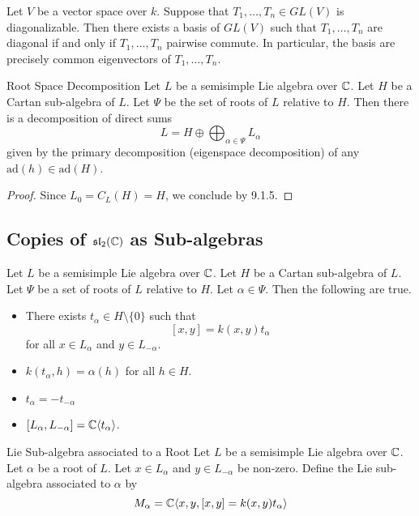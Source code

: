 \documentclass[a4paper]{article}
\begin{document}
\begin{lmm}{}{} Let $V$ be a vector space over $k$. Suppose that $T_1,\dots,T_n\in GL(V)$ is diagonalizable. Then there exists a basis of $GL(V)$ such that $T_1,\dots,T_n$ are diagonal if and only if $T_1,\dots,T_n$ pairwise commute. In particular, the basis are precisely common eigenvectors of $T_1,\dots,T_n$. 
\end{lmm}

\begin{thm}{Root Space Decomposition}{} Let $L$ be a semisimple Lie algebra over $\mathbb{C}$. Let $H$ be a Cartan sub-algebra of $L$. Let $\Psi$ be the set of roots of $L$ relative to $H$. Then there is a decomposition of direct sums $$L=H\oplus\bigoplus_{\alpha\in\Psi}L_\alpha$$ given by the primary decomposition (eigenspace decomposition) of any $\text{ad}(h)\in\text{ad}(H)$. \tcbline
\begin{proof}
Since $L_0=C_L(H)=H$, we conclude by 9.1.5. 
\end{proof}
\end{thm}

\subsection{Copies of $\mathfrak{sl}_2(\mathbb{C})$ as Sub-algebras}
\begin{lmm}{}{} Let $L$ be a semisimple Lie algebra over $\mathbb{C}$. Let $H$ be a Cartan sub-algebra of $L$. Let $\Psi$ be a set of roots of $L$ relative to $H$. Let $\alpha\in\Psi$. Then the following are true. 
\begin{itemize}
\item There exists $t_\alpha\in H\setminus\{0\}$ such that $$[x,y]=k(x,y)t_\alpha$$ for all $x\in L_\alpha$ and $y\in L_{-\alpha}$. 
\item $k(t_\alpha,h)=\alpha(h)$ for all $h\in H$. 
\item $t_\alpha=-t_{-\alpha}$
\item $[L_\alpha,L_{-\alpha}]=\mathbb{C}\langle t_\alpha\rangle$. 
\end{itemize}
\end{lmm}

\begin{defn}{Lie Sub-algebra associated to a Root}{} Let $L$ be a semisimple Lie algebra over $\mathbb{C}$. Let $\alpha$ be a root of $L$. Let $x\in L_\alpha$ and $y\in L_{-\alpha}$ be non-zero. Define the Lie sub-algebra associated to $\alpha$ by $$M_\alpha=\mathbb{C}\langle x,y,[x,y]=k(x,y)t_\alpha\rangle$$
\end{defn}
\end{document}
